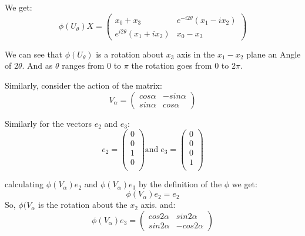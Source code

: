 We get:
\begin{equation}
 \phi({U_{\theta}})X=
     \begin{pmatrix}
    x_0+x_3 & e^{-i2\theta}(x_1-ix_2) \\
    e^{i2\theta}(x_1+ix_2) & x_0-x_3
    \end{pmatrix}
\end{equation}

We can see that $\phi({U_{\theta}})$ is a rotation about $ x_3 $ axis in the $x_1 - x_2$ plane an Angle of $2\theta$. And as $\theta$ ranges from 0 to $\pi$ the rotation goes from 0 to $2\pi$. 

Similarly, consider the action of the matrix:
\begin{equation}
 V_{\alpha}=
     \begin{pmatrix}
    cos\alpha & -sin\alpha\\
    sin\alpha & cos\alpha
    \end{pmatrix}
\end{equation}

Similarly for the vectors $e_2$ and $e_3$:
\begin{equation}
e_2=
    \begin{pmatrix}
      0\\
      0\\
      1\\
      0\\
    \end{pmatrix}
    \text{and}\;
    e_3=
    \begin{pmatrix}
    0\\
    0\\
    0\\
    1\\
    \end{pmatrix}
\end{equation}

calculating $\phi(V_{\alpha})e_2$ and $\phi(V_{\alpha})e_3$ by the definition of the $\phi$ we get:
\begin{equation}
    \phi(V_{\alpha})e_2=e_2
\end{equation}
So, $\phi(V_{\alpha}$ is the rotation about the $x_2$ axis. and:
\begin{equation}
    \phi(V_{\alpha})e_3=
    {
    \begin{pmatrix}
    cos2\alpha & sin2\alpha\\
    sin2\alpha & -cos2\alpha
    \end{pmatrix}
    }
\end{equation}


